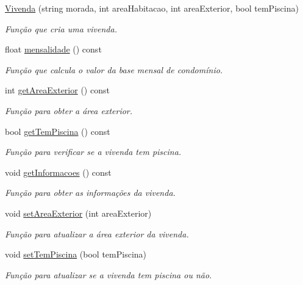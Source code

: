 \begin{DoxyCompactItemize}
\item 
\hyperlink{class_vivenda_a55423f0f9af77c03237c80a07e9e7509}{Vivenda} (string morada, int area\+Habitacao, int area\+Exterior, bool tem\+Piscina)
\begin{DoxyCompactList}\small\item\em Função que cria uma vivenda. \end{DoxyCompactList}\item 
float \hyperlink{class_vivenda_ad542e2b2f31da8c24b706211efc880d8}{mensalidade} () const 
\begin{DoxyCompactList}\small\item\em Função que calcula o valor da base mensal de condomínio. \end{DoxyCompactList}\item 
int \hyperlink{class_vivenda_a28bc8d025d1fd0da9a49dc73d34165ef}{get\+Area\+Exterior} () const 
\begin{DoxyCompactList}\small\item\em Função para obter a área exterior. \end{DoxyCompactList}\item 
bool \hyperlink{class_vivenda_aa65508502441fffa1efa69e8708ecc85}{get\+Tem\+Piscina} () const 
\begin{DoxyCompactList}\small\item\em Função para verificar se a vivenda tem piscina. \end{DoxyCompactList}\item 
void \hyperlink{class_vivenda_a6d00de5d5b0c62e6d65772bd01a7af2a}{get\+Informacoes} () const 
\begin{DoxyCompactList}\small\item\em Função para obter as informações da vivenda. \end{DoxyCompactList}\item 
void \hyperlink{class_vivenda_a78aade265c5cbaaa300c46b248b4e977}{set\+Area\+Exterior} (int area\+Exterior)
\begin{DoxyCompactList}\small\item\em Função para atualizar a área exterior da vivenda. \end{DoxyCompactList}\item 
void \hyperlink{class_vivenda_aad5c1d4f93acd1b96bc652d04a76a029}{set\+Tem\+Piscina} (bool tem\+Piscina)
\begin{DoxyCompactList}\small\item\em Função para atualizar se a vivenda tem piscina ou não. \end{DoxyCompactList}\end{DoxyCompactItemize}



